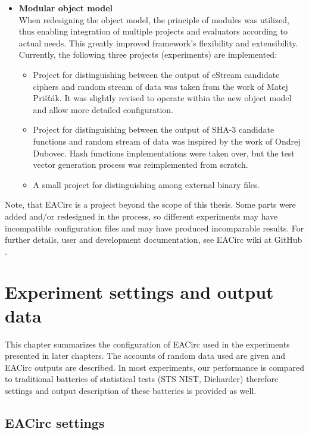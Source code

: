 \documentclass[12pt,oneside]{fithesis2}
\begin{document}
\begin{itemize}
\item \textbf{Modular object model}\\
When redesigning the object model, the principle of modules was utilized, thus enabling integration of multiple projects 
and evaluators according to actual needs. This greatly improved framework's flexibility and extensibility.
Currently, the following three projects (experiments) are implemented:
\begin{itemize}
\item Project for distinguishing between the output of eStream candidate ciphers and random stream of data was taken from the work of 
Matej Prišťák.
It was slightly revised to operate within the new object model and allow more detailed configuration.
\item Project for distinguishing between the output of SHA-3 candidate functions and random stream of data was inspired by the work of 
Ondrej Dubovec.
Hash functions implementations were taken over, but the test vector generation process was reimplemented from scratch. 
\item A small project for distinguishing among external binary files.
\end{itemize}
\end{itemize}

\noindent
Note, that EACirc is a project beyond the scope of this thesis. Some parts were added and/or redesigned in the process, so
different experiments may have incompatible configuration files and may have produced incomparable results.
For further details, user and development documentation, see EACirc wiki at GitHub \cite{eacirc-github}.	

\chapter{Experiment settings and output data}
\label{chap:settings}

This chapter summarizes the configuration of EACirc used in the experiments presented in later chapters.
The accounts of random data used are given and EACirc outputs are described. 
In most experiments, our performance is compared to traditional batteries of statistical tests (STS NIST, Dieharder)
therefore settings and output description of these batteries is provided as well.

\section{EACirc settings}
\label{sec:settings-eacirc}
\end{document}
